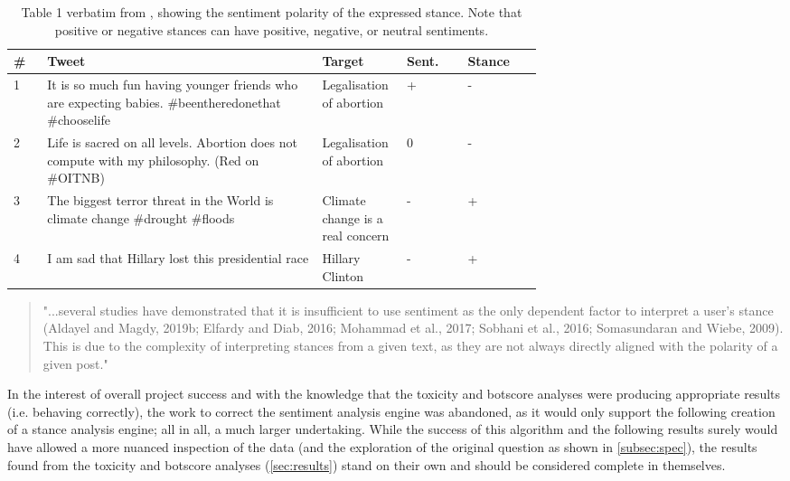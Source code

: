 \documentclass[a4paper,11pt]{article}  %
\begin{document}
	\begin{table}[htb!]
		\caption{Table 1 verbatim from \citeauthor{aldayelStanceDetectionSocial2021}, showing the sentiment polarity of the expressed stance. Note that positive or negative stances can have positive, negative, or neutral sentiments.}
		\label{tab:4}
		\begin{center}
			\begin{tabular}{||l p{0.52\linewidth} p{0.16\linewidth} l l||} 
				\hline
				\# & Tweet & Target & Sent. & Stance \\ [0.5ex] 
				\hline\hline
				1 & \raggedright{It is so much fun having younger friends who are expecting babies.} \#beentheredonethat \#chooselife & Legalisation of abortion & + & - \\ 
				\hline
				2 & \raggedright{Life is sacred on all levels. Abortion does not compute with my philosophy.} (Red on \#OITNB) & Legalisation of abortion & 0 & - \\ 
				\hline
				3 & \raggedright{The biggest terror threat in the World is climate change \#drought \#floods} & Climate change is a real concern & - & + \\ 
				\hline
				4 & \raggedright{I am sad that Hillary lost this presidential race} & Hillary Clinton & - & + \\ 
				\hline
			\end{tabular}
			\vspace{0.2cm}
			\begin{quote}
				"...several studies have demonstrated that it is insufficient to use sentiment as the only dependent factor to interpret a user’s stance (Aldayel and Magdy, 2019b; Elfardy and Diab, 2016; Mohammad et al., 2017; Sobhani et al., 2016; Somasundaran and Wiebe, 2009). This is due to the complexity of interpreting stances from a given text, as they are not always directly aligned with the polarity of a given post."
			\end{quote}
		\end{center}

	\end{table}
	
	In the interest of overall project success and with the knowledge that the toxicity and botscore analyses were producing appropriate results (i.e. behaving correctly), the work to correct the sentiment analysis engine was abandoned, as it would only support the following creation of a stance analysis engine; all in all, a much larger undertaking. While the success of this algorithm and the following results surely would have allowed a more nuanced inspection of the data (and the exploration of the original question as shown in \autoref{subsec:spec}), the results found from the toxicity and botscore analyses (\autoref{sec:results}) stand on their own and should be considered complete in themselves.
	
\end{document}
